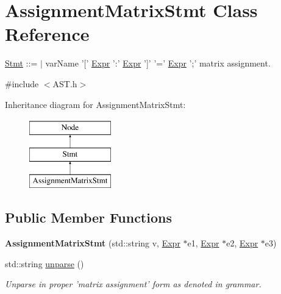 \hypertarget{classAssignmentMatrixStmt}{\section{Assignment\-Matrix\-Stmt Class Reference}
\label{classAssignmentMatrixStmt}
}


\hyperlink{classStmt}{Stmt} \-:\-:= $\vert$ var\-Name '\mbox{[}' \hyperlink{classExpr}{Expr} '\-:' \hyperlink{classExpr}{Expr} '\mbox{]}' '=' \hyperlink{classExpr}{Expr} ';' matrix assignment.  




{\ttfamily \#include $<$A\-S\-T.\-h$>$}

Inheritance diagram for Assignment\-Matrix\-Stmt\-:\begin{figure}[H]
\begin{center}
\leavevmode
\includegraphics[height=3.000000cm]{classAssignmentMatrixStmt}
\end{center}
\end{figure}
\subsection*{Public Member Functions}
\begin{DoxyCompactItemize}
\item 
\hypertarget{classAssignmentMatrixStmt_a203671ccddaeef9edac2834b8db3b423}{{\bfseries Assignment\-Matrix\-Stmt} (std\-::string v, \hyperlink{classExpr}{Expr} $\ast$e1, \hyperlink{classExpr}{Expr} $\ast$e2, \hyperlink{classExpr}{Expr} $\ast$e3)}\label{classAssignmentMatrixStmt_a203671ccddaeef9edac2834b8db3b423}

\item 
\hypertarget{classAssignmentMatrixStmt_adbdf4dee03753d6a0a098cf3a9eff6a8}{std\-::string \hyperlink{classAssignmentMatrixStmt_adbdf4dee03753d6a0a098cf3a9eff6a8}{unparse} ()}\label{classAssignmentMatrixStmt_adbdf4dee03753d6a0a098cf3a9eff6a8}

\begin{DoxyCompactList}\small\item\em Unparse in proper 'matrix assignment' form as denoted in grammar. \end{DoxyCompactList}\end{DoxyCompactItemize}


